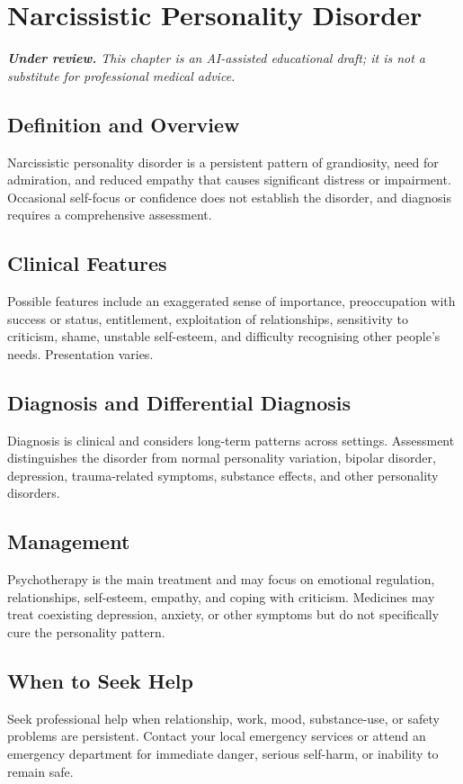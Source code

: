 \chapter{Narcissistic Personality Disorder}

\medskip
\noindent\textit{\textbf{Under review.} This chapter is an AI-assisted educational draft; it is not a substitute for professional medical advice.}

\section*{Definition and Overview}
Narcissistic personality disorder is a persistent pattern of grandiosity, need for admiration, and reduced empathy that causes significant distress or impairment. Occasional self-focus or confidence does not establish the disorder, and diagnosis requires a comprehensive assessment.

\section*{Clinical Features}
Possible features include an exaggerated sense of importance, preoccupation with success or status, entitlement, exploitation of relationships, sensitivity to criticism, shame, unstable self-esteem, and difficulty recognising other people's needs. Presentation varies.

\section*{Diagnosis and Differential Diagnosis}
Diagnosis is clinical and considers long-term patterns across settings. Assessment distinguishes the disorder from normal personality variation, bipolar disorder, depression, trauma-related symptoms, substance effects, and other personality disorders.

\section*{Management}
Psychotherapy is the main treatment and may focus on emotional regulation, relationships, self-esteem, empathy, and coping with criticism. Medicines may treat coexisting depression, anxiety, or other symptoms but do not specifically cure the personality pattern.

\section*{When to Seek Help}
Seek professional help when relationship, work, mood, substance-use, or safety problems are persistent. Contact your local emergency services or attend an emergency department for immediate danger, serious self-harm, or inability to remain safe.
